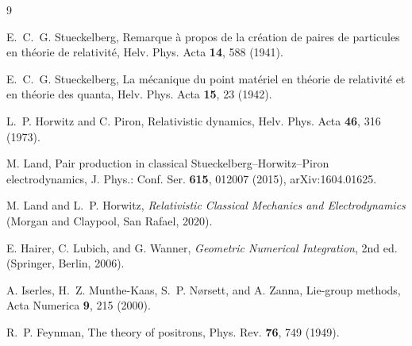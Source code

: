 \documentclass[aps,prd,reprint,nofootinbib]{revtex4-2}
\begin{document}
\begin{thebibliography}{9}

E.~C.~G. Stueckelberg,
Remarque \`a propos de la cr\'eation de paires de particules
en th\'eorie de relativit\'e,
Helv. Phys. Acta \textbf{14}, 588 (1941).

E.~C.~G. Stueckelberg,
La m\'ecanique du point mat\'eriel en th\'eorie de relativit\'e et en
th\'eorie des quanta,
Helv. Phys. Acta \textbf{15}, 23 (1942).

L.~P. Horwitz and C. Piron,
Relativistic dynamics,
Helv. Phys. Acta \textbf{46}, 316 (1973).

M. Land,
Pair production in classical Stueckelberg--Horwitz--Piron
electrodynamics,
J. Phys.: Conf. Ser. \textbf{615}, 012007 (2015),
arXiv:1604.01625.

M. Land and L.~P. Horwitz,
\textit{Relativistic Classical Mechanics and Electrodynamics}
(Morgan and Claypool, San Rafael, 2020).

E. Hairer, C. Lubich, and G. Wanner,
\textit{Geometric Numerical Integration}, 2nd ed.
(Springer, Berlin, 2006).

A. Iserles, H.~Z. Munthe-Kaas, S.~P. N{\o}rsett, and A. Zanna,
Lie-group methods,
Acta Numerica \textbf{9}, 215 (2000).

R.~P. Feynman,
The theory of positrons,
Phys. Rev. \textbf{76}, 749 (1949).

\end{thebibliography}
\end{document}
